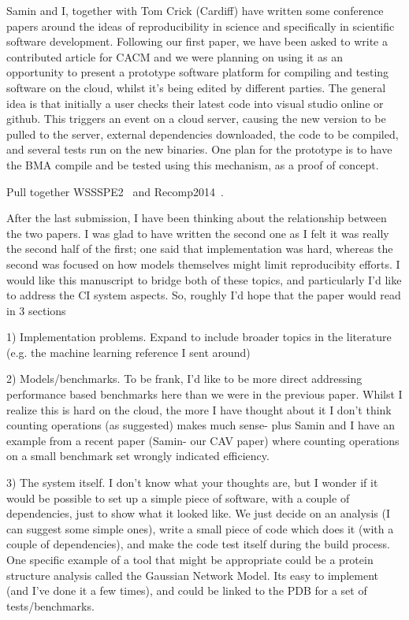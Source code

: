 \documentclass[a4paper,11pt]{article}
\begin{document}
Samin and I, together with Tom Crick (Cardiff) have written some
conference papers around the ideas of reproducibility in science and specifically in
scientific software development. Following our first paper, we have
been asked to write a contributed article for CACM and we were
planning on using it as an opportunity to present a prototype software
platform for compiling and testing software on the cloud, whilst it's
being edited by different parties. The general idea is that initially
a user checks their latest code into visual studio online or
github. This triggers an event on a cloud server, causing the new
version to be pulled to the server, external dependencies downloaded,
the code to be compiled, and several tests run on the new
binaries. One plan for the prototype is to have the BMA compile and be
tested using this mechanism, as a proof of concept.


Pull together WSSSPE2~\cite{crick-et-al_wssspe2} and Recomp2014~\cite{crick-et-al_recomp2014}. 


After the last submission, I have been thinking about the relationship
between the two papers. I was glad to have written the second one as I
felt it was really the second half of the first; one said that
implementation was hard, whereas the second was focused on how models
themselves might limit reproducibity efforts. I would like this
manuscript to bridge both of these topics, and particularly I'd like
to address the CI system aspects. So, roughly I'd hope that the paper
would read in 3 sections

 

1) Implementation problems. Expand to include broader topics in the
literature (e.g. the machine learning reference I sent around)

 

2) Models/benchmarks. To be frank, I'd like to be more direct
addressing performance based benchmarks here than we were in the
previous paper. Whilst I realize this is hard on the cloud, the more I
have thought about it I don't think counting operations (as suggested)
makes much sense- plus Samin and I have an example from a recent paper
(Samin- our CAV paper) where counting operations on a small benchmark
set wrongly indicated efficiency.

 

3) The system itself. I don't know what your thoughts are, but I
wonder if it would be possible to set up a simple piece of software,
with a couple of dependencies, just to show what it looked like. We
just decide on an analysis (I can suggest some simple ones), write a
small piece of code which does it (with a couple of dependencies), and
make the code test itself during the build process. One specific
example of a tool that might be appropriate could be a protein
structure analysis called the Gaussian Network Model. Its easy to
implement (and I've done it a few times), and could be linked to the
PDB for a set of tests/benchmarks.
\end{document}

